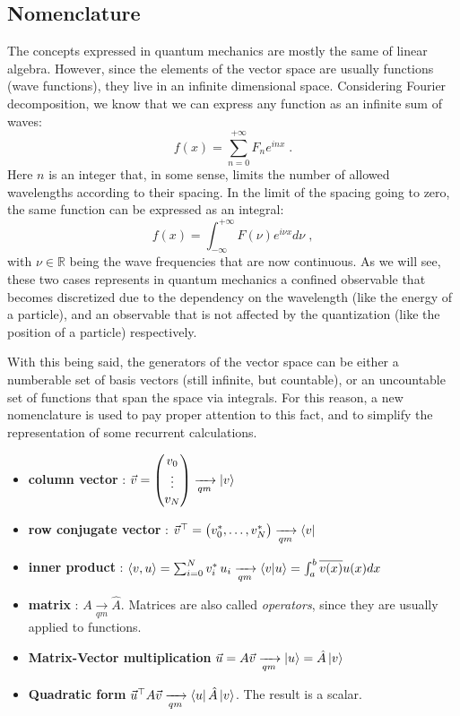 \documentclass[12pt,a4paper]{article}
\begin{document}
\subsection{Nomenclature}
The concepts expressed in quantum mechanics are mostly the same of linear algebra.
However, since the elements of the vector space are usually functions (wave functions),
they live in an infinite dimensional space. Considering Fourier decomposition, we know
that we can express any function as an infinite sum of waves:
$$
f(x) = \sum_{n=0}^{+\infty} F_n e^{inx} \; .
$$
Here $n$ is an integer that, in some sense, limits the number of allowed wavelengths
according to their spacing. In the limit of the spacing going to zero,
the same function can be expressed as an integral:
$$
f(x) = \int_{-\infty}^{+\infty} F(\nu) e^{i\nu x} d\nu \; ,
$$
with $\nu \in \mathbb{R}$ being the wave frequencies that are now continuous.
As we will see, these two cases represents in quantum mechanics a confined observable
that becomes discretized due to the dependency on the wavelength (like the energy of a particle),
and an observable that is not affected by the quantization (like the position of a particle)
respectively.

With this being said, the generators of the vector space can be either a numberable set of basis
vectors (still infinite, but countable), or an uncountable set of functions
that span the space via integrals. For this reason, a new nomenclature is used
to pay proper attention to this fact, and to simplify the representation
of some recurrent calculations.
\begin{itemize}
	\item \textbf{column vector} : $\vec{v} = \begin{pmatrix}
		v_0 \\
		\vdots \\
		v_N
	\end{pmatrix} \xrightarrow[qm]{} \ket{v}$
	\item \textbf{row conjugate vector} : $\vec{v}^\top = \begin{pmatrix} v_0^*, \dots, v_N^* \end{pmatrix} \xrightarrow[qm]{} \bra{v}$
	\item \textbf{inner product} : $\langle v , u \rangle = \sum_{i=0}^{N}v^*_i\,u_i \xrightarrow[qm]{} \braket{v}{u} = \int_{a}^{b}\overline{v(x)}u(x)dx$
	\item \textbf{matrix} : $A \xrightarrow[qm]{}\hat{A}$. Matrices are also called \textit{operators}, since they are usually applied to functions.
	\item \textbf{Matrix-Vector multiplication} $\vec{u} = A\vec{v} \xrightarrow[qm]{} \ket{u} = \hat{A}\ket{v}$
	\item \textbf{Quadratic form} $\vec{u}^\top A \vec{v} \xrightarrow[qm]{} \bra{u}\hat{A}\ket{v}$. The result is a scalar.
\end{itemize}
\end{document}
